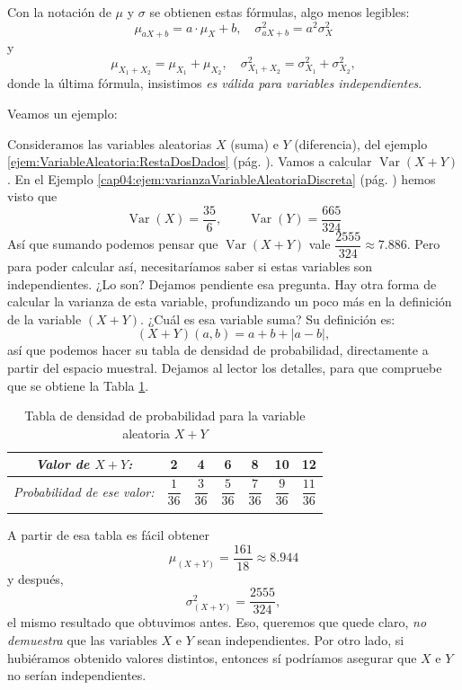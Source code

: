 Con la notación de $\mu$ y $\sigma$ se obtienen estas fórmulas, algo menos legibles:
    \[\mu_{aX+b}=a\cdot\mu_X + b,\quad \sigma^2_{aX+b}=a^2\sigma^2_X\]
y
\[\mu_{X_1+X_2}=\mu_{X_1}+\mu_{X_2},\quad \sigma^2_{X_1+X_2}=\sigma^2_{X_1}+\sigma^2_{X_2},\]
donde la última fórmula, insistimos {\em es válida para variables independientes}.

Veamos un ejemplo:
\begin{Ejemplo}
\label{cap04:ejem:varianzaSumaVariablesAleatoriasDiscretas}
Consideramos las variables aleatorias $X$ (suma) e $Y$ (diferencia), del ejemplo \ref{ejem:VariableAleatoria:RestaDosDados} (pág. \pageref{ejem:VariableAleatoria:RestaDosDados}). Vamos a calcular $\operatorname{Var}(X+Y)$. En el Ejemplo \ref{cap04:ejem:varianzaVariableAleatoriaDiscreta} (pág. \pageref{cap04:ejem:varianzaVariableAleatoriaDiscreta}) hemos visto que \[\operatorname{Var}(X)=\dfrac{35}{6},\qquad \operatorname{Var}(Y)=\dfrac{665}{324}\]
Así que sumando podemos pensar que $\operatorname{Var}(X+Y)$ vale $\dfrac{2555}{324}\approx 7.886$. Pero para poder calcular así, necesitaríamos saber si estas variables son independientes. ¿Lo son?
Dejamos pendiente esa pregunta. Hay otra forma de calcular la varianza de esta variable, profundizando un poco más en la definición de la variable $(X+Y)$. ¿Cuál es esa variable suma? Su definición es:
\[(X + Y)(a,b)=a+b+|a-b|,\]
así que podemos hacer su tabla de densidad de probabilidad, directamente a partir del espacio muestral. Dejamos al lector los detalles, para que compruebe que se obtiene la Tabla \ref{cap04:tabla:VariableAleatoriaXmasY}.
    \begin{table}[ht]
    \begin{center}
    \begin{tabular}[t]{|c|c|c|c|c|c|c|}
    \hline
    \rule{0cm}{0.5cm}{\em Valor de $X+Y$:}&2&4&6&8&10&12\\
    \hline
    \rule{0cm}{0.7cm}{\em Probabilidad de ese valor:}&$\dfrac{1}{36}$&$\dfrac{3}{36}$&$\dfrac{5}{36}$&$\dfrac{7}{36}$&$\dfrac{9}{36}$&$\dfrac{11}{36}$\\
    &&&&&&\\
    \hline
    \end{tabular}
    \end{center}
    \caption{Tabla de densidad de probabilidad para la variable aleatoria $X+Y$}\label{cap04:tabla:VariableAleatoriaXmasY}
    \end{table}
A partir de esa tabla es fácil obtener
\[\mu_{(X+Y)}=\dfrac{161}{18}\approx 8.944\]
y después,
\[\sigma^2_{(X+Y)}=\dfrac{2555}{324},\]
el mismo resultado que obtuvimos antes. Eso, queremos que quede claro, {\sf\em no demuestra} que las variables $X$ e $Y$ sean independientes. Por otro lado, si hubiéramos obtenido valores distintos, entonces sí podríamos asegurar que $X$ e $Y$ no serían independientes.


\end{Ejemplo}
